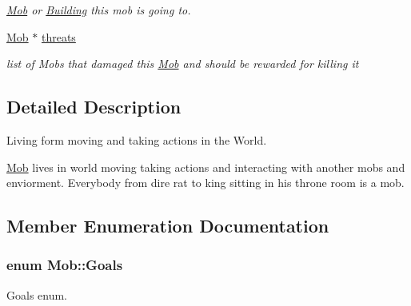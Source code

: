 \begin{DoxyCompactItemize}
\begin{DoxyCompactList}\small\item\em \hyperlink{class_mob}{Mob} or \hyperlink{class_building}{Building} this mob is going to. \end{DoxyCompactList}\item 
\hyperlink{class_mob}{Mob} $\ast$ \hyperlink{class_mob_a07f79a9fd434b9b26098b3b6d5d4a93e}{threats}\hypertarget{class_mob_a07f79a9fd434b9b26098b3b6d5d4a93e}{}\label{class_mob_a07f79a9fd434b9b26098b3b6d5d4a93e}

\begin{DoxyCompactList}\small\item\em list of Mobs that damaged this \hyperlink{class_mob}{Mob} and should be rewarded for killing it \end{DoxyCompactList}\end{DoxyCompactItemize}


\subsection{Detailed Description}
Living form moving and taking actions in the World. 

\hyperlink{class_mob}{Mob} lives in world moving taking actions and interacting with another mobs and enviorment. Everybody from dire rat to king sitting in his throne room is a mob. 

\subsection{Member Enumeration Documentation}
\subsubsection[{\texorpdfstring{Goals}{Goals}}]{\setlength{\rightskip}{0pt plus 5cm}enum {\bf Mob\+::\+Goals}\hspace{0.3cm}{\ttfamily [protected]}}\hypertarget{class_mob_a886346a9f913203df0797f2c84dd8962}{}\label{class_mob_a886346a9f913203df0797f2c84dd8962}


Goals enum. 

